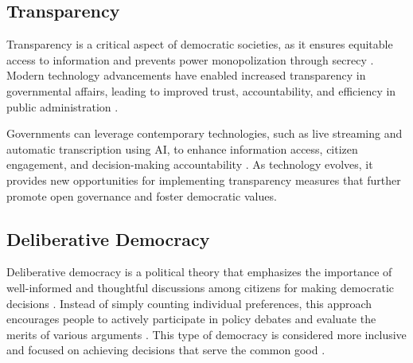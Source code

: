 \documentclass{IEEEtran}
\begin{document}
\subsection{Transparency}

Transparency is a critical aspect of democratic societies, as it ensures equitable access to information and prevents power monopolization through secrecy \cite{florini2000democratizing}. Modern technology advancements have enabled increased transparency in governmental affairs, leading to improved trust, accountability, and efficiency in public administration \cite{grimmelikhuijsen2012transparency}.

Governments can leverage contemporary technologies, such as live streaming and automatic transcription using AI, to enhance information access, citizen engagement, and decision-making accountability \cite{meijer2009understanding}. As technology evolves, it provides new opportunities for implementing transparency measures that further promote open governance and foster democratic values.


\subsection{Deliberative Democracy}

Deliberative democracy is a political theory that emphasizes the importance of well-informed and thoughtful discussions among citizens for making democratic decisions \cite{gutmann2004why, habermas1996between}. Instead of simply counting individual preferences, this approach encourages people to actively participate in policy debates and evaluate the merits of various arguments \cite{habermas1996between}. This type of democracy is considered more inclusive and focused on achieving decisions that serve the common good \cite{cohen1997deliberation}.
\end{document}
